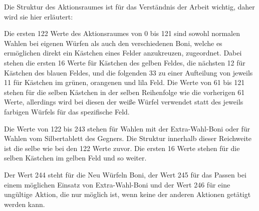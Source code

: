 Die Struktur des Aktionsraumes ist für das Verständnis der Arbeit wichtig, daher wird sie hier erläutert:

Die ersten 122 Werte des Aktionsraumes von 0 bis 121 sind sowohl normalen Wahlen bei eigenen Würfen als auch den verschiedenen Boni, welche es ermöglichen direkt ein Kästchen eines Felder anzukreuzen, zugeordnet. Dabei stehen die ersten 16 Werte für Kästchen des gelben Feldes, die nächsten 12 für Kästchen des blauen Feldes, und die folgenden 33 zu einer Aufteilung von jeweils 11 für Kästchen im grünen, orangenen und lila Feld. Die Werte von 61 bis 121 stehen für die selben Kästchen in der selben Reihenfolge wie die vorherigen 61 Werte, allerdings wird bei diesen der weiße Würfel verwendet statt des jeweils farbigen Würfels für das spezifische Feld.

Die Werte von 122 bis 243 stehen für Wahlen mit der Extra-Wahl-Boni oder für Wahlen vom Silbertablett des Gegners. Die Struktur innerhalb dieser Reichweite ist die selbe wie bei den 122 Werte zuvor. Die ersten 16 Werte stehen für die selben Kästchen im gelben Feld und so weiter.

Der Wert 244 steht für die Neu Würfeln Boni, der Wert 245 für das Passen bei einem möglichen Einsatz von Extra-Wahl-Boni und der Wert 246 für eine ungültige Aktion, die nur möglich ist, wenn keine der anderen Aktionen getätigt werden kann.\\
